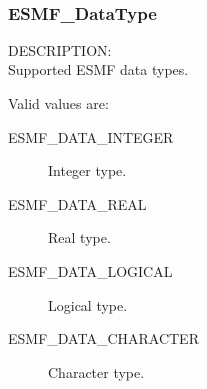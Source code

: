 \mbox{}\hrulefill\

\subsubsection{ESMF\_DataType}

{\sf DESCRIPTION:\\}
Supported ESMF data types.

Valid values are:
\begin{description}
\item [ESMF\_DATA\_INTEGER]
      Integer type.
\item [ESMF\_DATA\_REAL]
      Real type.
\item [ESMF\_DATA\_LOGICAL]
      Logical type.
\item [ESMF\_DATA\_CHARACTER]
      Character type.
\end{description}

\mbox{}\hrulefill\









